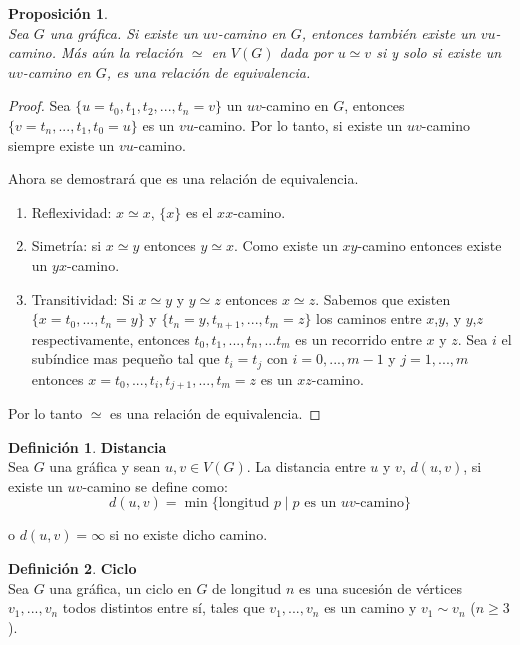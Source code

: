 \documentclass[12pt]{book}
\newtheorem{proposition}{Proposición}
\theoremstyle{definition}
\newtheorem{definition}{Definición}
\begin{document}
\begin{proposition}\textbf{}\\
  Sea $G$ una gráfica. Si existe un $uv$-camino en $G$, entonces también existe un $vu$-camino. Más aún la
  relación $\simeq$ en $V(G)$ dada por $u\simeq v$ si y solo si existe
  un $uv$-camino en $G$, es una relación de equivalencia.
\end{proposition}
\begin{proof} Sea $\{u=t_0,t_1,t_2,...,t_n=v \}$ un $uv$-camino
en $G$, entonces $\{v=t_n,...,t_1,t_0=u \}$ es un $vu$-camino. Por lo tanto, si existe un $uv$-camino siempre existe un $vu$-camino.

 Ahora se demostrará que es una relación de equivalencia.

\begin{enumerate}

\item Reflexividad: $x\simeq x$, $\{ x\}$ es el $xx$-camino.

\item Simetría: si $x \simeq y$ entonces $y \simeq x$. Como existe un $xy$-camino entonces existe un
  $yx$-camino.

\item Transitividad: Si $x \simeq y$ y $y \simeq z$ entonces $x \simeq
  z$.  Sabemos que existen $\{x=t_0,...,t_n=y\}$ y
  $\{t_n=y,t_{n+1},...,t_m=z \}$ los caminos entre $x$,$y$, y $y$,$z$
  respectivamente, entonces $ t_0, t_1,...,t_n,...t_m$ es un recorrido
  entre $x$ y $z$. Sea $i$ el subíndice mas pequeño tal que $t_i =
  t_j$ con $i=0,...,m-1$ y $j =1,...,m$ entonces
  $x=t_0,...,t_i,t_{j+1},...,t_m=z$ es un $xz$-camino.
\end{enumerate}

Por lo tanto $\simeq$ es una relación de equivalencia.
\end{proof}

\begin{definition}\textbf{Distancia}\\
Sea $G$ una gráfica y sean $u,v\in V(G)$. La distancia entre $u$ y $v$, $d(u,v)$, si existe
  un $uv$-camino se define como:
  \begin{equation*}
    d(u,v)=\min\{ \text{longitud $p$}  \mid \text{$p$ es un $uv$-camino} \}
  \end{equation*}

  o $d(u,v)=\infty$ si no existe dicho camino.
\end{definition}

\begin{definition}\textbf{Ciclo}\\
  Sea $G$ una gráfica, un ciclo en $G$ de longitud $n$ es una sucesión
  de vértices $v_1,...,v_n$ todos distintos entre sí, tales que
  $v_1,...,v_n$ es un camino y $v_1 \sim v_n$ ($n\geq 3$).
\end{definition}
\end{document}
